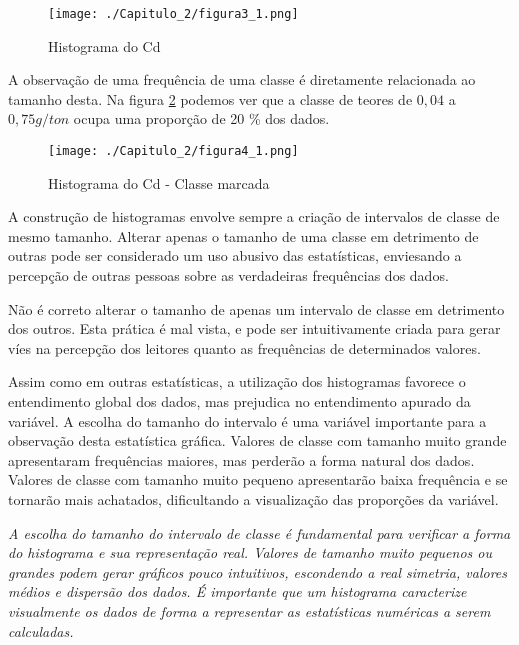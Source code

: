 \FloatBarrier
\begin{figure}[!htb]
\centering
\texttt{[image: ./Capitulo\_2/figura3\_1.png]}	
\caption{Histograma do Cd}
\label{Fig3_1}
\end{figure}
\FloatBarrier

A observação de uma frequência de uma classe é diretamente relacionada ao tamanho desta. Na figura \ref{Fig4_1} podemos ver que a classe de teores de $0,04$ a $0,75g/ton$ ocupa uma proporção de 20 \% dos dados.

\FloatBarrier
\begin{figure}[!htb]
\centering
\texttt{[image: ./Capitulo\_2/figura4\_1.png]}	
\caption{Histograma do Cd - Classe marcada}
\label{Fig4_1}
\end{figure}
\FloatBarrier

A construção de histogramas envolve sempre a criação de intervalos de classe de mesmo tamanho. Alterar apenas o tamanho de uma classe em detrimento de outras pode ser considerado um uso abusivo das estatísticas, enviesando a percepção de outras pessoas sobre as verdadeiras frequências dos dados. 

\begin{remark}
	Não é correto alterar o tamanho de apenas um intervalo de classe em detrimento dos outros. Esta prática é mal vista, e pode ser intuitivamente criada para gerar víes na percepção dos leitores quanto as frequências de determinados valores. 
\end{remark}

Assim como em outras estatísticas, a utilização dos histogramas favorece o entendimento global dos dados, mas prejudica no entendimento apurado da variável. A escolha do tamanho do intervalo é uma variável importante para a observação desta estatística gráfica. Valores de classe com tamanho muito grande apresentaram frequências maiores, mas perderão a forma natural dos dados. Valores de classe com tamanho muito pequeno apresentarão baixa frequência e se tornarão mais achatados, dificultando a visualização das proporções da variável. 

\begin{proposition}
	\textit{A escolha do tamanho do intervalo de classe é fundamental para verificar a forma do histograma e sua representação real. Valores de tamanho muito pequenos ou grandes podem gerar gráficos pouco intuitivos, escondendo a real simetria, valores médios e dispersão dos dados. É importante que um histograma caracterize visualmente os dados de forma a representar as estatísticas numéricas a serem calculadas.} 
\end{proposition}

